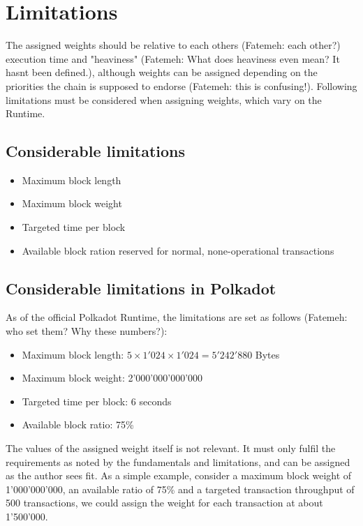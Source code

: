 \documentclass[11pt,a4paper]{article}
\begin{document}
\section{Limitations}\label{sec:limitations}
The assigned weights should be relative to each others (Fatemeh: each other?) execution time and "heaviness" (Fatemeh: What does heaviness even mean? It hasnt been defined.),
although weights can be assigned depending on the priorities the chain is supposed to endorse (Fatemeh: this is confusing!).
Following limitations must be considered when assigning weights, which vary on the Runtime.

\subsection{Considerable limitations}
\begin{itemize}
\item Maximum block length
\item Maximum block weight
\item Targeted time per block
\item Available block ration reserved for normal, none-operational transactions
\end{itemize}

\subsection{Considerable limitations in Polkadot}
As of the official Polkadot Runtime, the limitations are set as follows (Fatemeh: who set them? Why these numbers?):

\begin{itemize}
\item Maximum block length: $5 \times 1'024 \times 1'024 = 5'242'880$ Bytes
\item Maximum block weight: 2'000'000'000'000
\item Targeted time per block: 6 seconds
\item Available block ratio: 75\%
\end{itemize}

The values of the assigned weight itself is not relevant. It must only fulfil the requirements
as noted by the fundamentals and limitations, and can be assigned as the author sees fit.
As a simple example, consider a maximum block weight of 1'000'000'000, an available ratio of
75\% and a targeted transaction throughput of 500 transactions, we could assign the weight
for each transaction at about 1'500'000.
\newline
\end{document}
